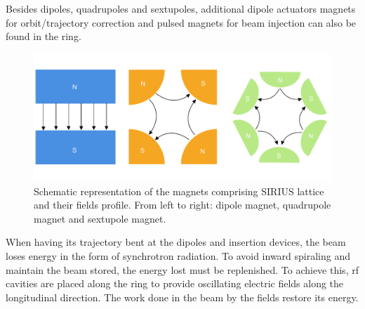 Besides dipoles, quadrupoles and sextupoles, additional dipole actuators magnets for orbit/trajectory correction and pulsed magnets for beam injection can also be found in the ring.
\begin{figure}[htb]
    \includegraphics[width=\textwidth]{Images/magnets.pdf}
    \caption[Schematic representation of the magnets comprising SIRIUS lattice and their fields profile.]{Schematic representation of the magnets comprising SIRIUS lattice and their fields profile. From left to right: dipole magnet, quadrupole magnet and sextupole magnet.}
    \label{fig:magnets_fields}
\end{figure}

When having its trajectory bent at the dipoles and insertion devices,
the beam loses energy in the form of synchrotron radiation. To avoid inward spiraling and maintain the beam stored, the energy lost must be replenished. To achieve this, \gls*{rf} cavities are placed along the ring to provide oscillating electric fields along the longitudinal direction. The work done in the beam by the fields restore its energy.

